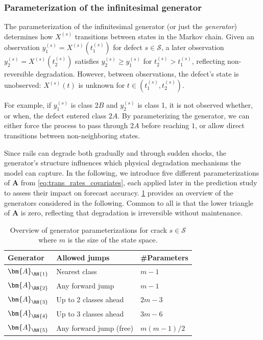 \subsubsection{Parameterization of the infinitesimal generator} \label{sec:generator_params}
The parameterization of the infinitesimal generator (or just the \textit{generator}) determines how $X^{(s)}$ transitions between states in the Markov chain. 
Given an observation $y_1^{(s)} = X^{(s)}\left(t_1^{(s)}\right)$ for defect $s \in \mathcal{S}$, a later observation $y_2^{(s)} = X^{(s)}\left(t_2^{(s)}\right)$ satisfies $y_2^{(s)} \geq y_1^{(s)}$ for $t_2^{(s)} > t_1^{(s)}$, reflecting non-reversible degradation. However, between observations, the defect’s state is unobserved: $X^{(s)}(t)$ is unknown for $t \in \left(t_1^{(s)}, t_2^{(s)}\right)$.

For example, if $y_1^{(s)}$ is class $2B$ and $y_2^{(s)}$ is class 1, it is not observed whether, or when, the defect entered class $2A$. By parameterizing the generator, we can either force the process to pass through $2A$ before reaching $1$, or allow direct transitions between non-neighboring states. 

Since rails can degrade both gradually and through sudden shocks, the generator’s structure influences which physical degradation mechanisms the model can capture. In the following, we introduce five different parameterizations of $\bm{A}$ from \cref{eq:trans_rates_covariates}, each applied later in the prediction study to assess their impact on forecast accuracy. \cref{tab:generators_overview} provides an overview of the generators considered in the following. Common to all is that the lower triangle of $\bm{A}$ is zero, reflecting that degradation is irreversible without maintenance.

\begin{table}[htb!]
\centering
\caption{Overview of generator parameterizations for crack $s \in \mathcal{S}$ where $m$ is the size of the state space.}
\label{tab:generators_overview}
\begin{tabular}{@{}lll@{}}
\toprule
Generator & Allowed jumps & \#Parameters \\%
\midrule
$\bm{A}_{\RN{1}}$ & Nearest class & $m - 1$ \\%
$\bm{A}_{\RN{2}}$ & Any forward jump & $m - 1$ \\%
$\bm{A}_{\RN{3}}$ & Up to 2 classes ahead & $2m - 3$ \\%
$\bm{A}_{\RN{4}}$ & Up to 3 classes ahead & $3m - 6$ \\%
$\bm{A}_{\RN{5}}$ & Any forward jump (free) & $m(m-1)/2$ \\%
\bottomrule
\end{tabular}
\end{table}

